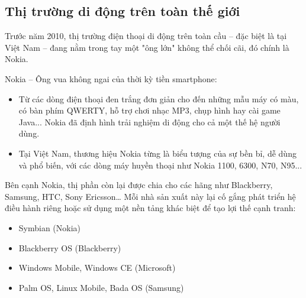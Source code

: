 \subsection{Thị trường di động trên toàn thế giới}
\renewcommand{\labelitemi}{--}    
    \begin{flushleft}
        \hspace*{0.8cm}Trước năm 2010, thị trường điện thoại di động trên toàn cầu – đặc biệt là tại Việt Nam – đang nằm trong tay một "ông lớn" không thể chối cãi, đó chính là Nokia.
    \end{flushleft}

    \begin{flushleft}
      \hspace*{0.8cm}Nokia – Ông vua không ngai của thời kỳ tiền smartphone:
      \setlength{\leftmargini}{1.5cm}
      \begin{itemize}
          \item Từ các dòng điện thoại đen trắng đơn giản cho đến những mẫu máy có màu, có bàn phím QWERTY, hỗ trợ chơi nhạc MP3, chụp hình hay cài game Java... Nokia đã định hình trải nghiệm di động cho cả một thế hệ người dùng.
          \item Tại Việt Nam, thương hiệu Nokia từng là biểu tượng của sự bền bỉ, dễ dùng và phổ biến, với các dòng máy huyền thoại như Nokia 1100, 6300, N70, N95...
      \end{itemize}
    \end{flushleft}

    \begin{flushleft}
      \hspace*{0.8cm}Bên cạnh Nokia, thị phần còn lại được chia cho các hãng như Blackberry, Samsung, HTC, Sony Ericsson… Mỗi nhà sản xuất này lại cố gắng phát triển hệ điều hành riêng hoặc sử dụng một nền tảng khác biệt để tạo lợi thế cạnh tranh:
      \setlength{\leftmargini}{1.5cm}
      \begin{itemize}
          \item Symbian (Nokia)
          \item Blackberry OS (Blackberry)
          \item Windows Mobile, Windows CE (Microsoft)
          \item Palm OS, Linux Mobile, Bada OS (Samsung)
      \end{itemize}
    \end{flushleft}

